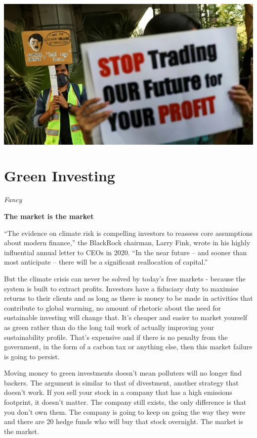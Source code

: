 \documentclass[
]{book}
\begin{document}
\includegraphics{fig/trading_future4profits.png}

\hypertarget{green-investing}{%
\section{Green Investing}\label{green-investing}}

\emph{Fancy}

\textbf{The market is the market}

``The evidence on climate risk is compelling investors to reassess core assumptions about modern finance,'' the BlackRock chairman, Larry Fink, wrote in his highly influential annual letter to CEOs in 2020. ``In the near future -- and sooner than most anticipate -- there will be a significant reallocation of capital.''

But the climate crisis can never be solved by today's free markets -
because the system is built to extract profits.
Investors have a fiduciary duty to maximise returns to their clients and as long as there is money to be made in activities that contribute to global warming, no amount of rhetoric about the need for sustainable investing will change that.
It's cheaper and easier to market yourself as green rather than do the long tail work of actually improving your sustainability profile.
That's expensive and if there is no penalty from the government, in the form of a carbon tax or anything else, then this market failure is going to persist.

Moving money to green investments doesn't mean polluters will no longer find backers.
The argument is similar to that of divestment, another strategy that doesn't work.
If you sell your stock in a company that has a high emissions footprint,
it doesn't matter.
The company still exists, the only difference is that you don't own them.
The company is going to keep on going the way they were and
there are 20 hedge funds who will buy that stock overnight.
The market is the market.
\end{document}
